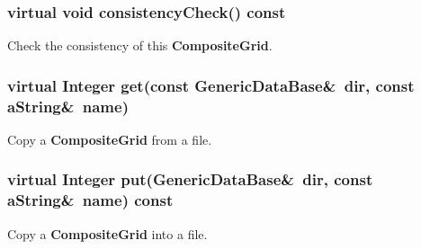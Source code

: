 \documentclass{article}
\begin{document}
  \subsubsection{virtual void consistencyCheck() const}
  \label{CompositeGrid::consistencyCheck() const}
    Check the consistency of this \textbf{CompositeGrid}.

  \subsubsection{virtual Integer get(const GenericDataBase\&~dir, const aString\&~name)}
  \label{CompositeGrid::get(dir,name)}
    Copy a \textbf{CompositeGrid} from a file.

  \subsubsection{virtual Integer put(GenericDataBase\&~dir, const aString\&~name) const}
  \label{CompositeGrid::put(dir,name) const}
    Copy a \textbf{CompositeGrid} into a file.
\end{document}

